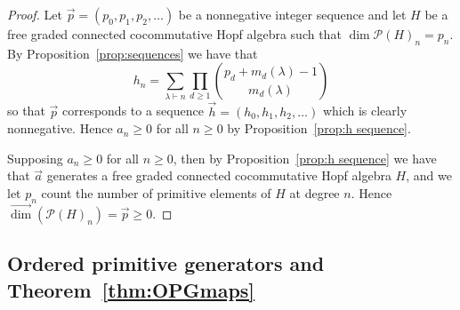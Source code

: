 \documentclass[11pt]{amsart}
\theoremstyle{definition}
\numberwithin{equation}{section}
\newcommand{\vecdim}{\overrightarrow{\dim}}
\newcommand{\felix}[1]{\todo[size=\tiny,color=Cyan]{#1 \\ \hfill --- Félix}}
\begin{document}
\begin{proof}	
    Let \(\vec{p} = (p_0, p_1, p_2, \ldots)\) be a nonnegative integer sequence and let \(H\) be a 
    free graded connected cocommutative Hopf algebra such that \(\dim \mathcal{P}(H)_n = p_n\).
    By Proposition~\ref{prop:sequences} we have that
    \[
        h_n = \sum_{\lambda \vdash n} \prod_{d \geq 1} \binom{p_d + m_d(\lambda) -1}{m_d(\lambda)}
    \]
    so that \(\vec{p}\)  corresponds to a sequence \(\vec{h} = (h_0, h_1, h_2, \ldots)\) which is clearly nonnegative. 
    Hence \(a_n \geq 0\) 
    for all \(n \geq 0\) by Proposition~\ref{prop:h sequence}.

    Supposing \(a_n \geq 0\) for all \(n \geq 0\), then by Proposition~\ref{prop:h sequence} we have that \(\vec{a}\) generates a free graded connected 
    cocommutative Hopf algebra \(H\), and we let \(p_n\) count the number of primitive elements of \(H\) at degree \(n\).
    Hence \(\vecdim(\mathcal{P}(H)_n) = \vec{p}\geq 0\).

\end{proof} 


\subsection{Ordered primitive generators and Theorem~\ref{thm:OPGmaps}}
\end{document}
